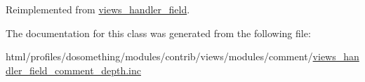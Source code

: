 Reimplemented from \hyperlink{classviews__handler__field_a82ff951c5e9ceb97b2eab86f880cbc1e}{views\_\-handler\_\-field}.

The documentation for this class was generated from the following file:\begin{DoxyCompactItemize}
\item 
html/profiles/dosomething/modules/contrib/views/modules/comment/\hyperlink{views__handler__field__comment__depth_8inc}{views\_\-handler\_\-field\_\-comment\_\-depth.inc}\end{DoxyCompactItemize}
